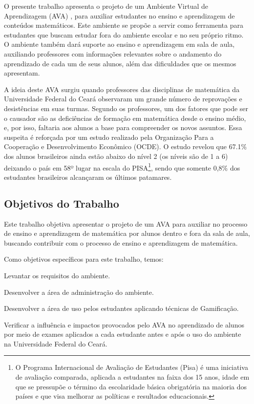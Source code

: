 O presente trabalho apresenta o projeto de um Ambiente Virtual de Aprendizagem (AVA) \cite{valentini2010aprendizagem}, para auxiliar estudantes no ensino e aprendizagem de conteúdos matemáticos. Este 
ambiente se propõe a servir como ferramenta para estudantes que buscam estudar fora do ambiente escolar e no seu próprio ritmo. O ambiente também dará suporte ao ensino e aprendizagem em sala de 
aula, auxiliando professores com informações relevantes sobre o andamento do aprendizado de cada um de seus alunos, além das dificuldades que os mesmos apresentam.

A ideia deste AVA surgiu quando professores das disciplinas de matemática da Universidade Federal do Cear\'a observaram um grande número de reprovações e desistências em suas turmas. Segundo os professores, um dos fatores que pode ser o causador são as deficiências de formação em matemática desde o ensino médio, e, por isso, faltaria aos alunos a base para compreender os novos assuntos. Essa suspeita é reforçada por um estudo realizado pela Organização Para a Cooperação e Desenvolvimento Econômico (OCDE)\cite{pisainfocus2016}. O estudo revelou que 67.1\% dos alunos brasileiros ainda estão abaixo do nível 2 (os níveis são de 1 a 6) deixando o país em 58º lugar na escala do PISA\footnote{O Programa Internacional de Avaliação de Estudantes (Pisa) é uma iniciativa de avaliação comparada, aplicada a estudantes na faixa dos 15 anos, idade em que se pressupõe o término da escolaridade básica obrigatória na maioria dos países e que visa melhorar as políticas e resultados educacionais.}, sendo que somente 0,8\% dos estudantes brasileiros alcançaram os últimos patamares.

\subsection{Objetivos do Trabalho}

Este trabalho objetiva apresentar o projeto de um AVA para auxiliar no processo de ensino e aprendizagem de matemática por alunos dentro e fora da sala de aula, buscando contribuir com o 
processo de ensino e aprendizagem de matem\'atica. 

Como objetivos específicos para este trabalho, temos: 
\begin{alineas}
	\item Levantar os requisitos do ambiente.
	\item Desenvolver a área de administração do ambiente.
    \item Desenvolver a área de uso pelos estudantes aplicando técnicas de Gamificação.
    \item Verificar a influência e impactos provocados pelo AVA no aprendizado de alunos por meio de exames aplicados a cada estudante antes e após o uso do ambiente na Universidade Federal do Ceará.
\end{alineas}


